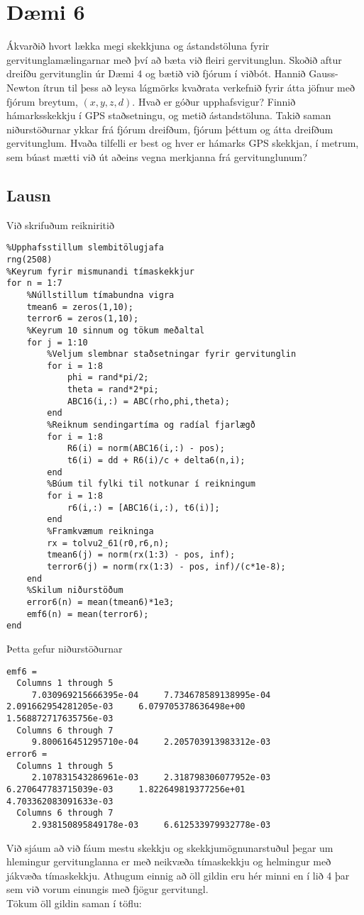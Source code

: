 \documentclass[11pt]{article}
\begin{document}
\section*{Dæmi 6}
Ákvarðið hvort lækka megi skekkjuna og ástandstöluna fyrir gervitunglamælingarnar með því að bæta við fleiri gervitunglun. Skoðið aftur dreifðu gervitunglin úr Dæmi 4 og bætið við fjórum í viðbót. Hannið Gauss-Newton ítrun til þess að leysa lágmörks kvaðrata verkefnið fyrir átta jöfnur með fjórum breytum, $(x,y,z,d)$. Hvað er góður upphafsvigur? Finnið hámarksskekkju í GPS staðsetningu, og metið ástandstöluna. Takið saman niðurstöðurnar ykkar frá fjórum dreifðum, fjórum þéttum og átta dreifðum gervitunglum. Hvaða tilfelli er best og hver er hámarks GPS skekkjan, í metrum, sem búast mætti við út aðeins vegna merkjanna frá gervitunglunum?

\subsection*{Lausn}

Við skrifuðum reikniritið

\begin{verbatim}
%Upphafsstillum slembitölugjafa
rng(2508)
%Keyrum fyrir mismunandi tímaskekkjur
for n = 1:7
    %Núllstillum tímabundna vigra
    tmean6 = zeros(1,10);
    terror6 = zeros(1,10);
    %Keyrum 10 sinnum og tökum meðaltal
    for j = 1:10
        %Veljum slembnar staðsetningar fyrir gervitunglin
        for i = 1:8
            phi = rand*pi/2;
            theta = rand*2*pi;
            ABC16(i,:) = ABC(rho,phi,theta);
        end
        %Reiknum sendingartíma og radíal fjarlægð
        for i = 1:8
            R6(i) = norm(ABC16(i,:) - pos);
            t6(i) = dd + R6(i)/c + delta6(n,i);
        end
        %Búum til fylki til notkunar í reikningum
        for i = 1:8
            r6(i,:) = [ABC16(i,:), t6(i)];
        end
        %Framkvæmum reikninga
        rx = tolvu2_61(r0,r6,n);
        tmean6(j) = norm(rx(1:3) - pos, inf);
        terror6(j) = norm(rx(1:3) - pos, inf)/(c*1e-8);
    end
    %Skilum niðurstöðum
    error6(n) = mean(tmean6)*1e3;
    emf6(n) = mean(terror6);
end
\end{verbatim}
Þetta gefur niðurstöðurnar
\begin{verbatim}
emf6 =
  Columns 1 through 5
     7.030969215666395e-04     7.734678589138995e-04     2.091662954281205e-03     6.079705378636498e+00     1.568872717635756e-03
  Columns 6 through 7
     9.800616451295710e-04     2.205703913983312e-03
error6 =
  Columns 1 through 5
     2.107831543286961e-03     2.318798306077952e-03     6.270647783715039e-03     1.822649819377256e+01     4.703362083091633e-03
  Columns 6 through 7
     2.938150895849178e-03     6.612533979932778e-03
\end{verbatim}
Við sjáum að við fáum mestu skekkju og skekkjumögnunarstuðul þegar um hlemingur gervitunglanna er með neikvæða tímaskekkju og helmingur með jákvæða tímaskekkju. Athugum einnig að öll gildin eru hér minni en í lið 4 þar sem við vorum einungis með fjögur gervitungl.\\
Tökum öll gildin saman í töflu:
\end{document}
